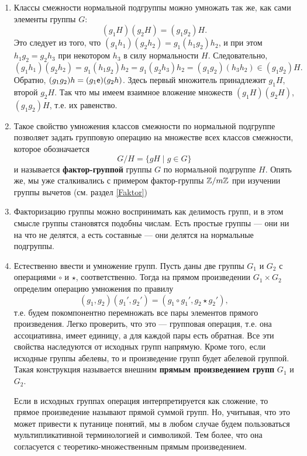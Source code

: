 \begin{enumerate}
\item Классы смежности нормальной подгруппы можно умножать так же, как сами элементы группы $G$:
$$
(g_1H)(g_2H)=(g_1g_2)H.
$$
Это следует из того, что $(g_1h_1)(g_2h_2)=g_1(h_1g_2)h_2$, и при этом $h_1g_2=g_2h_3$ при некотором $h_3$ в силу нормальности $H$. Следовательно,
$$
(g_1h_1)(g_2h_2) = g_1(h_1g_2)h_2 = g_1(g_2h_3)h_2=(g_1g_2)(h_3h_2)\in (g_1g_2)H.
$$
Обратно, $(g_1g_2)h=(g_1\mathsf e)(g_2h)$. Здесь первый множитель принадлежит $g_1H$, второй $g_2H$. Так что мы имеем взаимное вложение множеств $(g_1H)(g_2H)$, $(g_1g_2)H$, т.е. их равенство.

\item Такое свойство умножения классов смежности по нормальной подгруппе позволяет задать групповую операцию на множестве всех классов смежности, которое обозначается
$$
G/H = \{gH\mid g\in G\}
$$
и называется \textbf{фактор-группой} группы $G$ по нормальной подгруппе $H$. Опять же, мы уже сталкивались с примером фактор-группы $\mathbb Z/m\mathbb Z$ при изучении группы вычетов (см. раздел \ref{Faktor})

\item Факторизацию группы можно воспринимать как делимость групп, и в этом смысле группы становятся подобны числам. Есть простые группы --- они ни на что не делятся, а есть составные --- они делятся на нормальные подгруппы.

\item Естественно ввести и умножение групп. Пусть даны две группы $G_1$ и $G_2$ с операциями $\circ$ и $\star$, соответственно. Тогда на прямом произведении $G_1\times G_2$ определим операцию умножения по правилу
$$
(g_1,g_2)(g_1',g_2') = (g_1\circ g_1', g_2\star g_2'),
$$
т.е. будем покомпонентно перемножать все пары элементов прямого произведения. Легко проверить, что это --- групповая операция, т.е. она ассоциативна, имеет единицу, а для каждой пары есть обратная. Все эти свойства наследуются от исходных групп напрямую. Кроме того, если исходные группы абелевы, то и произведение групп будет абелевой группой. Такая конструкция называется внешним \textbf{прямым произведением групп} $G_1$ и $G_2$.

Если в исходных группах операция интерпретируется как сложение, то прямое произведение называют прямой суммой групп. Но, учитывая, что это может привести к путанице понятий, мы в любом случае будем пользоваться мультипликативной терминологией и символикой. Тем более, что она согласуется с теоретико-множественным прямым произведением.


\end{enumerate}
